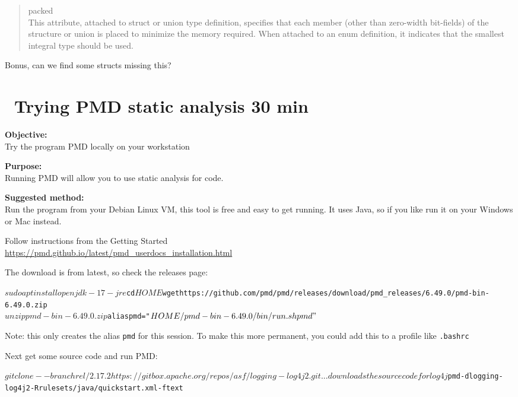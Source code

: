 \documentclass[a4paper,11pt,notitlepage]{report}
\begin{document}
\begin{quote}
packed\\
This attribute, attached to struct or union type definition, specifies that each member (other than zero-width bit-fields) of the structure or union is placed to minimize the memory required. When attached to an enum definition, it indicates that the smallest integral type should be used.
\end{quote}

Bonus, can we find some structs missing this?




\chapter{\faExclamationTriangle\ Trying PMD static analysis 30 min}
\label{ex:pmd-static}

{\bf Objective:}\\
Try the program PMD locally on your workstation


{\bf Purpose:}\\
Running PMD will allow you to use static analysis for code.

{\bf Suggested method:}\\
Run the program from your Debian Linux VM, this tool is free and easy to get running. It uses Java, so if you like run it on your Windows or Mac instead.

Follow instructions from the Getting Started\\
\url{https://pmd.github.io/latest/pmd_userdocs_installation.html}

The download is from latest, so check the releases page: 

\begin{alltt}\footnotesize
$ sudo apt install openjdk-17-jre
$ cd $HOME
$ wget https://github.com/pmd/pmd/releases/download/pmd_releases/6.49.0/pmd-bin-6.49.0.zip
$ unzip pmd-bin-6.49.0.zip
$ alias pmd="$HOME/pmd-bin-6.49.0/bin/run.sh pmd"
$
\end{alltt}

Note: this only creates the alias \verb+pmd+ for this session. To make this more permanent, you could add this to a profile like \verb+.bashrc+

Next get some source code and run PMD:
\begin{alltt}\footnotesize
$ git clone --branch rel/2.17.2 https://gitbox.apache.org/repos/asf/logging-log4j2.git
... downloads the source code for log4j
$ pmd -d logging-log4j2 -R rulesets/java/quickstart.xml -f text
\end{alltt}
\end{document}
